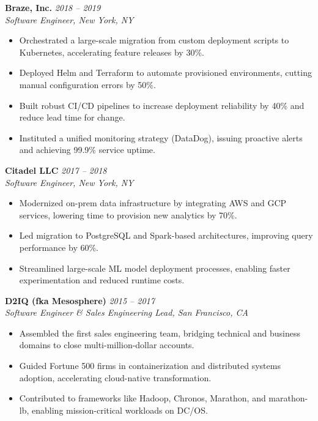 \documentclass[margin,line]{resume}
\begin{document}
\begin{resume}
\textbf{Braze, Inc.} \hfill \textit{2018 -- 2019}\\
\textit{Software Engineer, New York, NY}
\begin{itemize}[leftmargin=0.5cm]
    \item Orchestrated a large-scale migration from custom deployment scripts to Kubernetes, accelerating feature releases by 30\%.
    \item Deployed Helm and Terraform to automate provisioned environments, cutting manual configuration errors by 50\%.
    \item Built robust CI/CD pipelines to increase deployment reliability by 40\% and reduce lead time for change.
    \item Instituted a unified monitoring strategy (DataDog), issuing proactive alerts and achieving 99.9\% service uptime.
\end{itemize}

\textbf{Citadel LLC} \hfill \textit{2017 -- 2018}\\
\textit{Software Engineer, New York, NY}
\begin{itemize}[leftmargin=0.5cm]
    \item Modernized on-prem data infrastructure by integrating AWS and GCP services, lowering time to provision new analytics by 70\%.
    \item Led migration to PostgreSQL and Spark-based architectures, improving query performance by 60\%.
    \item Streamlined large-scale ML model deployment processes, enabling faster experimentation and reduced runtime costs.
\end{itemize}

\textbf{D2IQ (fka Mesosphere)} \hfill \textit{2015 -- 2017}\\
\textit{Software Engineer \& Sales Engineering Lead, San Francisco, CA}
\begin{itemize}[leftmargin=0.5cm]
    \item Assembled the first sales engineering team, bridging technical and business domains to close multi-million-dollar accounts.
    \item Guided Fortune 500 firms in containerization and distributed systems adoption, accelerating cloud-native transformation.
    \item Contributed to frameworks like Hadoop, Chronos, Marathon, and marathon-lb, enabling mission-critical workloads on DC/OS.
\end{itemize}


\end{resume}
\end{document}
